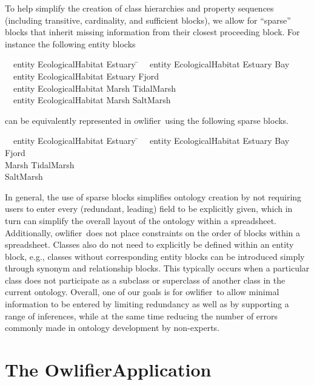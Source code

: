 \documentclass[preprint,number]{elsarticle}
\newcommand{\Owlifier}{\textsf{Owlifier}}
\newcommand{\owlifier}{\textsf{owlifier}}
\begin{document}
To help simplify the creation of class hierarchies and property
sequences (including transitive, cardinality, and sufficient blocks),
we allow for ``sparse'' blocks that inherit missing information from
their closest proceeding block. For instance the following entity
blocks
\begin{tabbing}
  ~~\textsf{entity} \= \textsf{EcologicalHabitat} \= \textsf{Estuary} \= \kill
  ~~\textsf{entity} \> \textsf{EcologicalHabitat} \> \textsf{Estuary} \> 
  \textsf{Bay}\\
  ~~\textsf{entity} \> \textsf{EcologicalHabitat} \> \textsf{Estuary} \>
  \textsf{Fjord} \\
  ~~\textsf{entity} \> \textsf{EcologicalHabitat} \> \textsf{Marsh} \>
  \textsf{TidalMarsh} \\ 
  ~~\textsf{entity} \> \textsf{EcologicalHabitat} \> \textsf{Marsh} \>
  \textsf{SaltMarsh}
\end{tabbing}
can be equivalently represented in \owlifier\ using the following
sparse blocks.
\begin{tabbing}
  ~~\textsf{entity} \= \textsf{EcologicalHabitat} \= \textsf{Estuary} \= \kill
  ~~\textsf{entity} \> \textsf{EcologicalHabitat} \> \textsf{Estuary} \> 
  \textsf{Bay}\\
  \> \> \> \textsf{Fjord} \\
  \> \> \textsf{Marsh} \> \textsf{TidalMarsh} \\ 
  \> \> \> \textsf{SaltMarsh}
\end{tabbing}
In general, the use of sparse blocks simplifies ontology creation by
not requiring users to enter every (redundant, leading) field to be
explicitly given, which in turn can simplify the overall layout of the
ontology within a spreadsheet.  Additionally, \owlifier\ does not place
constraints on the order of blocks within a spreadsheet. Classes also
do not need to explicitly be defined within an entity block, e.g.,
classes without corresponding entity blocks can be introduced simply
through synonym and relationship blocks. This typically occurs when a
particular class does not participate as a subclass or superclass of
another class in the current ontology. Overall, one of our goals is
for \owlifier\ to allow minimal information to be entered by limiting
redundancy as well as by supporting a range of inferences, while at
the same time reducing the number of errors commonly made in ontology
development by non-experts.

\section{The \Owlifier Application}
\label{sec:implementation}
\end{document}
